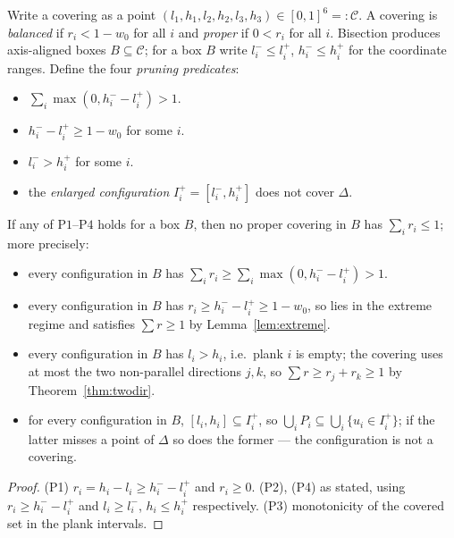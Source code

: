Write a covering as a point $(l_1,h_1,l_2,h_2,l_3,h_3)\in[0,1]^6=:\mathcal C$.
A covering is \emph{balanced} if $r_i<1-w_0$ for all $i$ and \emph{proper} if
$0<r_i$ for all $i$. Bisection produces axis-aligned boxes $B\subseteq\mathcal
C$; for a box $B$ write $l_i^-\le l_i^+$, $h_i^-\le h_i^+$ for the coordinate
ranges. Define the four \emph{pruning predicates}:
\begin{itemize}
\item[$\mathrm{P1}(B)$:] $\sum_i\max(0,h_i^--l_i^+)>1$.
\item[$\mathrm{P2}(B)$:] $h_i^--l_i^+\ge1-w_0$ for some $i$.
\item[$\mathrm{P4}(B)$:] $l_i^->h_i^+$ for some $i$.
\item[$\mathrm{P3}(B)$:] the \emph{enlarged configuration}
$I_i^+=[l_i^-,h_i^+]$ does not cover $\Delta$.
\end{itemize}

\begin{lemma}\label{lem:prunes}
If any of $\mathrm{P1}$--$\mathrm{P4}$ holds for a box $B$, then no proper
covering in $B$ has $\sum_ir_i\le1$; more precisely:
\begin{itemize}
\item[\rm(P1)] every configuration in $B$ has $\sum_ir_i\ge\sum_i\max(0,
h_i^--l_i^+)>1$.
\item[\rm(P2)] every configuration in $B$ has $r_i\ge h_i^--l_i^+\ge1-w_0$,
so lies in the extreme regime and satisfies $\sum r\ge1$ by
Lemma~\ref{lem:extreme}.
\item[\rm(P4)] every configuration in $B$ has $l_i>h_i$, i.e.\ plank $i$ is
empty; the covering uses at most the two non-parallel directions $j,k$, so
$\sum r\ge r_j+r_k\ge1$ by Theorem~\ref{thm:twodir}.
\item[\rm(P3)] for every configuration in $B$, $[l_i,h_i]\subseteq I_i^+$, so
$\bigcup_iP_i\subseteq\bigcup_i\{u_i\in I_i^+\}$; if the latter misses a point
of $\Delta$ so does the former --- the configuration is not a covering.
\end{itemize}
\end{lemma}
\begin{proof}
(P1) $r_i=h_i-l_i\ge h_i^--l_i^+$ and $r_i\ge0$. (P2), (P4) as stated,
using $r_i\ge h_i^--l_i^+$ and $l_i\ge l_i^-$, $h_i\le h_i^+$ respectively.
(P3) monotonicity of the covered set in the plank intervals.
\end{proof}


